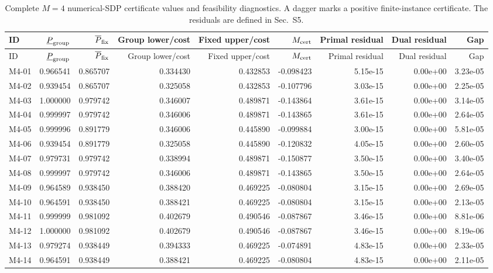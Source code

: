 \begin{longtable}{@{}lrrrrrrrr@{}}
\caption{Complete $M=4$ numerical-SDP certificate values and feasibility diagnostics. A dagger marks a positive finite-instance certificate. The residuals are defined in Sec.~S5.}\label{tab:supp-m4-cert}\\
\toprule
ID & $\underline P_{\rm group}$ & $\overline P_{\rm fix}$ & Group lower/cost & Fixed upper/cost & $M_{\rm cert}$ & Primal residual & Dual residual & Gap\\
\midrule
\endfirsthead
\toprule
ID & $\underline P_{\rm group}$ & $\overline P_{\rm fix}$ & Group lower/cost & Fixed upper/cost & $M_{\rm cert}$ & Primal residual & Dual residual & Gap\\
\midrule
\endhead
M4-01 & 0.966541 & 0.865707 & 0.334430 & 0.432853 & -0.098423 & 5.15e-15 & 0.00e+00 & 3.23e-05\\
M4-02 & 0.939454 & 0.865707 & 0.325058 & 0.432853 & -0.107796 & 3.03e-15 & 0.00e+00 & 2.25e-05\\
M4-03 & 1.000000 & 0.979742 & 0.346007 & 0.489871 & -0.143864 & 3.61e-15 & 0.00e+00 & 3.14e-05\\
M4-04 & 0.999997 & 0.979742 & 0.346006 & 0.489871 & -0.143865 & 3.61e-15 & 0.00e+00 & 2.64e-05\\
M4-05 & 0.999996 & 0.891779 & 0.346006 & 0.445890 & -0.099884 & 3.00e-15 & 0.00e+00 & 5.81e-05\\
M4-06 & 0.939454 & 0.891779 & 0.325058 & 0.445890 & -0.120832 & 4.05e-15 & 0.00e+00 & 2.60e-05\\
M4-07 & 0.979731 & 0.979742 & 0.338994 & 0.489871 & -0.150877 & 3.50e-15 & 0.00e+00 & 3.40e-05\\
M4-08 & 0.999997 & 0.979742 & 0.346006 & 0.489871 & -0.143865 & 3.50e-15 & 0.00e+00 & 2.64e-05\\
M4-09 & 0.964589 & 0.938450 & 0.388420 & 0.469225 & -0.080804 & 3.15e-15 & 0.00e+00 & 2.69e-05\\
M4-10 & 0.964591 & 0.938450 & 0.388421 & 0.469225 & -0.080804 & 3.15e-15 & 0.00e+00 & 2.13e-05\\
M4-11 & 0.999999 & 0.981092 & 0.402679 & 0.490546 & -0.087867 & 3.46e-15 & 0.00e+00 & 8.81e-06\\
M4-12 & 1.000000 & 0.981092 & 0.402679 & 0.490546 & -0.087867 & 3.46e-15 & 0.00e+00 & 8.19e-06\\
M4-13 & 0.979274 & 0.938449 & 0.394333 & 0.469225 & -0.074891 & 4.83e-15 & 0.00e+00 & 2.33e-05\\
M4-14 & 0.964591 & 0.938449 & 0.388421 & 0.469225 & -0.080804 & 4.83e-15 & 0.00e+00 & 2.11e-05\\

\end{longtable}
